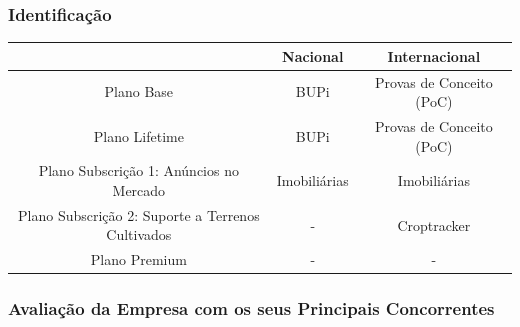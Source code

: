 \documentclass[11pt]{article}
\begin{document}
	\subsubsection{Identificação}
	
	\normalsize
	
	\begin{center}
		\begin{tabular}{ | c | c | c | }
			\hline
			& Nacional & Internacional \\
			\hline
			Plano Base & BUPi & Provas de Conceito (PoC) \\
			\hline
			Plano Lifetime & BUPi & Provas de Conceito (PoC) \\
			\hline
			Plano Subscrição 1: Anúncios no Mercado & Imobiliárias & Imobiliárias \\
			\hline 
			Plano Subscrição 2: Suporte a Terrenos Cultivados & - & Croptracker \\
			\hline   
			Plano Premium & - & - \\
			\hline
		\end{tabular}
	\end{center}

	\pagebreak
	
	\large
	\subsubsection{Avaliação da Empresa com os seus Principais Concorrentes}
	\normalsize
	
\end{document}
